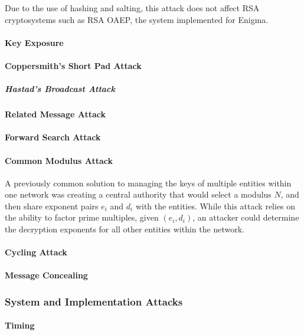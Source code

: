           Due to the use of hashing and salting, this attack does not affect RSA cryptosystems such as RSA OAEP, the system implemented for Enigma.
        
      \paragraph{Key Exposure}
      \paragraph{Coppersmith's Short Pad Attack}
        \subparagraph{Hastad's Broadcast Attack}
      \paragraph{Related Message Attack}
      \paragraph{Forward Search Attack}
      \paragraph{Common Modulus Attack} 
      
        A previously common solution to managing the keys of multiple entities within one network was creating a central authority that would select a modulus $N$, and then share exponent pairs $e_i$ and $d_i$ with the entities. While this attack relies on the ability to factor prime multiples, given $(e_i,d_i)$, an attacker could determine the decryption exponents for all other entities within the network. 
      
      \paragraph{Cycling Attack}
      
        	
      
      \paragraph{Message Concealing}
    
    \subsubsection{System and Implementation Attacks}
      \paragraph{Timing}
